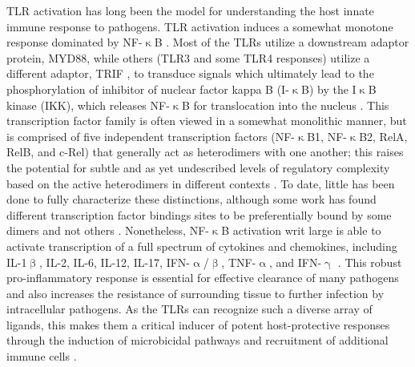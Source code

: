TLR activation has long been the model for understanding the host innate immune response to pathogens. TLR activation induces a somewhat monotone response dominated by NF\hyp{}$\upkappa$B \citep{Arbibe2000, Kawai2007, Brandt2013, Kawai2009}. Most of the TLRs utilize a downstream adaptor protein, MYD88, while others (TLR3 and some TLR4 responses) utilize a different adaptor, TRIF \citep{Yamamoto2003}, to transduce signals which ultimately lead to the phosphorylation of inhibitor of nuclear factor kappa B (I\hyp{}$\upkappa$B) by the I$\upkappa$B kinase (IKK), which releases NF\hyp{}$\upkappa$B for translocation into the nucleus \citep{Wright1990, Triantafilou2002, Kawai1999, Yamamoto2003, Akira2004, Kawasaki2014, Takeda2004}. This transcription factor family is often viewed in a somewhat monolithic manner, but is comprised of five independent transcription factors (NF\hyp{}$\upkappa$B1, NF\hyp{}$\upkappa$B2, RelA, RelB, and c\hyp{}Rel) that generally act as heterodimers with one another; this raises the potential for subtle and as yet undescribed levels of regulatory complexity based on the active heterodimers in different contexts \citep{Baeuerle1994, Finco1995, Rice1992, Oeckinghaus2009, Ghosh2012, Albensi2019, Liu2017}. To date, little has been done to fully characterize these distinctions, although some work has found different transcription factor bindings sites to be preferentially bound by some dimers and not others \citep{Siggers2011, Ramsey2019, Florio2022}. Nonetheless, NF\hyp{}$\upkappa$B activation writ large is able to activate transcription of a full spectrum of cytokines and chemokines, including IL\hyp{}1$\upbeta$, IL\hyp{}2, IL\hyp{}6, IL\hyp{}12, IL\hyp{}17, IFN\hyp{}$\upalpha$/$\upbeta$, TNF\hyp{}$\upalpha$, and IFN\hyp{}$\upgamma$ \citep{Pahl1999, Liu2017, Gilmore2006}. This robust pro\hyp{}inflammatory response is essential for effective clearance of many pathogens and also increases the resistance of surrounding tissue to further infection by intracellular pathogens. As the TLRs can recognize such a diverse array of ligands, this makes them a critical inducer of potent host\hyp{}protective responses through the induction of microbicidal pathways and recruitment of additional immune cells \citep{Kawai2007, Kawasaki2014}. 

